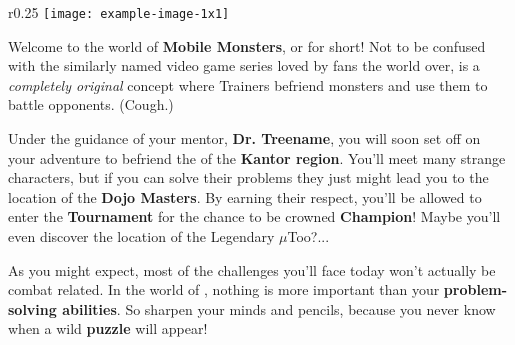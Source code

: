 
\begin{wrapfigure}{r}{0.25\textwidth} %
    \centering
    \texttt{[image: example-image-1x1]}
\end{wrapfigure}

Welcome to the world of \textbf{Mobile Monsters}, or \textbf{\mappMobimon}
for short! Not to be confused with the similarly named video game series loved
by fans the world over, \mappMobimon{} is a \textit{completely original} concept
where Trainers befriend monsters and use them to battle opponents. (Cough.)

Under the guidance of your mentor, \textbf{Dr. Treename}, you will soon set off
on your adventure to befriend the \mappMobimon{} of the \textbf{Kantor region}.
You'll meet many strange characters, but if you can solve their problems
they just might lead you to the location of the \textbf{Dojo Masters}.
By earning their respect, you'll be allowed to enter the
\textbf{\mappMobimon{} Tournament} for the chance to be crowned
\textbf{\mappMobimon{} Champion}! Maybe you'll even discover the location
of the Legendary \mappMobimon{} \(\mu\)Too?...

As you might expect, most of the challenges you'll face today won't actually
be combat related. In the world of \mappMobimon{}, nothing is more important
than your \textbf{problem-solving abilities}. So sharpen your minds and
pencils, because you never know when a wild \textbf{puzzle} will appear!


